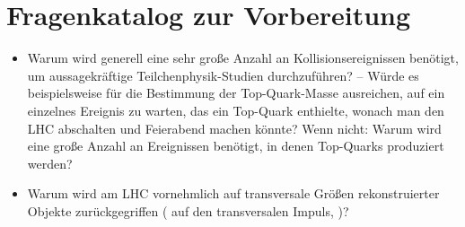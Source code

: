 \chapter{Fragenkatalog zur Vorbereitung}

\begin{itemize}
\item Warum wird generell eine sehr große Anzahl an Kollisionsereignissen benötigt, um aussagekräftige Teilchenphysik-Studien durchzuführen? -- Würde es beispielsweise für die Bestimmung der Top-Quark-Masse ausreichen, auf ein einzelnes Ereignis zu warten, das ein Top-Quark enthielte, wonach man den LHC abschalten und Feierabend machen könnte? Wenn nicht: Warum wird eine große Anzahl an Ereignissen benötigt, in denen Top-Quarks produziert werden?
\item Warum wird am LHC vornehmlich auf transversale Größen rekonstruierter Objekte zurückgegriffen (\zB{} auf den transversalen Impuls, \pT{})? 
\end{itemize}
